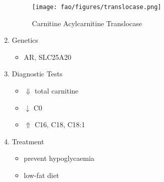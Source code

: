 \documentclass[12pt]{scrartcl}
\begin{document}
\begin{enumerate}
\begin{figure}[htbp]
\centering
\texttt{[image: fao/figures/translocase.png]}
\caption{\label{fig:org961599b}Carnitine Acylcarnitine Translocase}
\end{figure}

\item Genetics
\label{sec:org2dcf199}
\begin{itemize}
\item AR, SLC25A20
\end{itemize}
\item Diagnostic Tests
\label{sec:org9d39ee7}
\begin{itemize}
\item \(\Downarrow\) total carnitine
\item \(\downarrow\) C0
\item \(\Uparrow\) C16, C18, C18:1
\end{itemize}
\item Treatment
\label{sec:org4098de3}
\begin{itemize}
\item prevent hypoglycaemia
\item low-fat diet
\end{itemize}
\end{enumerate}
\end{document}
